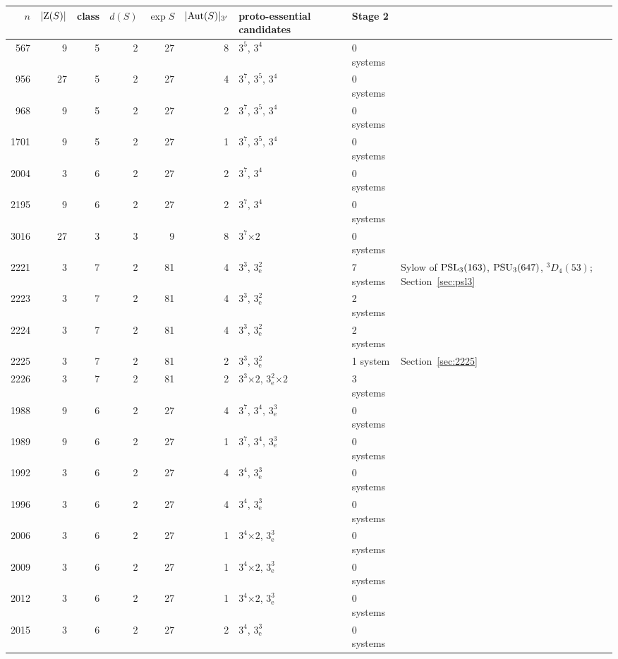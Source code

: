 {\small
\begin{tabular}{rrrrrrlll}
\toprule
$n$ & $|\mathrm{Z}(S)|$ & class & $d(S)$ & $\exp S$ & $|\mathrm{Aut}(S)|_{3'}$ & proto-essential candidates & Stage 2 & \\
\midrule
567 & 9 & 5 & 2 & 27 & 8 & $3^{5}$, $3^{4}$ & 0 systems & \\
956 & 27 & 5 & 2 & 27 & 4 & $3^{7}$, $3^{5}$, $3^{4}$ & 0 systems & \\
968 & 9 & 5 & 2 & 27 & 2 & $3^{7}$, $3^{5}$, $3^{4}$ & 0 systems & \\
1701 & 9 & 5 & 2 & 27 & 1 & $3^{7}$, $3^{5}$, $3^{4}$ & 0 systems & \\
2004 & 3 & 6 & 2 & 27 & 2 & $3^{7}$, $3^{4}$ & 0 systems & \\
2195 & 9 & 6 & 2 & 27 & 2 & $3^{7}$, $3^{4}$ & 0 systems & \\
3016 & 27 & 3 & 3 & 9 & 8 & $3^{7}$$\times2$ & 0 systems & \\
2221 & 3 & 7 & 2 & 81 & 4 & $3^{3}$, $3^{2}_{\mathrm{e}}$ & 7 systems & Sylow of $\mathrm{PSL}_3(163)$, $\mathrm{PSU}_3(647)$, ${}^3D_4(53)$; Section~\ref{sec:psl3}\\
2223 & 3 & 7 & 2 & 81 & 4 & $3^{3}$, $3^{2}_{\mathrm{e}}$ & 2 systems & \\
2224 & 3 & 7 & 2 & 81 & 4 & $3^{3}$, $3^{2}_{\mathrm{e}}$ & 2 systems & \\
2225 & 3 & 7 & 2 & 81 & 2 & $3^{3}$, $3^{2}_{\mathrm{e}}$ & 1 system & Section~\ref{sec:2225}\\
2226 & 3 & 7 & 2 & 81 & 2 & $3^{3}$$\times2$, $3^{2}_{\mathrm{e}}$$\times2$ & 3 systems & \\
1988 & 9 & 6 & 2 & 27 & 4 & $3^{7}$, $3^{4}$, $3^{3}_{\mathrm{e}}$ & 0 systems & \\
1989 & 9 & 6 & 2 & 27 & 1 & $3^{7}$, $3^{4}$, $3^{3}_{\mathrm{e}}$ & 0 systems & \\
1992 & 3 & 6 & 2 & 27 & 4 & $3^{4}$, $3^{3}_{\mathrm{e}}$ & 0 systems & \\
1996 & 3 & 6 & 2 & 27 & 4 & $3^{4}$, $3^{3}_{\mathrm{e}}$ & 0 systems & \\
2006 & 3 & 6 & 2 & 27 & 1 & $3^{4}$$\times2$, $3^{3}_{\mathrm{e}}$ & 0 systems & \\
2009 & 3 & 6 & 2 & 27 & 1 & $3^{4}$$\times2$, $3^{3}_{\mathrm{e}}$ & 0 systems & \\
2012 & 3 & 6 & 2 & 27 & 1 & $3^{4}$$\times2$, $3^{3}_{\mathrm{e}}$ & 0 systems & \\
2015 & 3 & 6 & 2 & 27 & 2 & $3^{4}$, $3^{3}_{\mathrm{e}}$ & 0 systems & \\

\end{tabular}}
